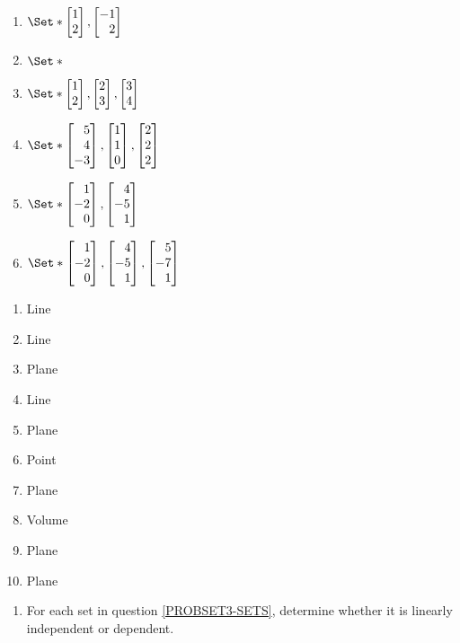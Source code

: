 \begin{exercises}
\begin{problist}
\begin{enumerate}
			\item $\Set*{\mat{1\\2},\mat{-1\\2}}$

			\item $\Set*{}$

			\item $\Set*{\mat{1\\2},\mat{2\\3},\mat{3\\4}}$

			\item $\Set*{\mat{5\\4\\-3},\mat{1\\1\\0},\mat{2\\2\\2}}$

			\item $\Set*{\mat{1\\-2\\0},\mat{4\\-5\\1}}$

			\item $\Set*{\mat{1\\-2\\0},\mat{4\\-5\\1},\mat{5\\-7\\1}}$
		\end{enumerate}
		\begin{solution}
			\begin{enumerate}
				\item Line
				\item Line
				\item Plane
				\item Line
				\item Plane
				\item Point
				\item Plane
				\item Volume
				\item Plane
				\item Plane
			\end{enumerate}
		\end{solution}
		
		\prob
		\begin{enumerate}
			\item For each set in question \ref{PROBSET3-SETS}, determine whether it is
				linearly independent or dependent.


\end{enumerate}
\end{problist}
\end{exercises}
